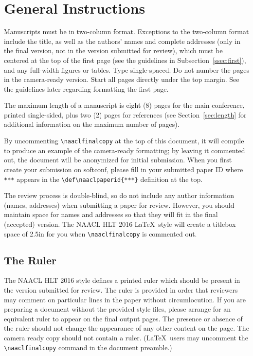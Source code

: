 \documentclass[11pt,letterpaper]{article}
\def\naaclpaperid{***} %
\begin{document}
\section{General Instructions}

Manuscripts must be in two-column format.  Exceptions to the
two-column format include the title, as well as the 
authors' names and complete
addresses (only in the final version, not in the version submitted for review), 
which must be centered at the top of the first page (see
the guidelines in Subsection~\ref{ssec:first}), and any full-width
figures or tables.  Type single-spaced.  Do not number the pages 
in the camera-ready version.
Start all pages directly under the top margin.  See the guidelines
later regarding formatting the first page.

The maximum length of a manuscript is eight (8) pages for the main
conference, printed single-sided, plus two (2) pages for references
(see Section~\ref{sec:length} for additional information on the
maximum number of pages). 

By uncommenting {\small\verb|\naaclfinalcopy|} at the top of this 
 document, it will compile to produce an example of the camera-ready formatting; by leaving it commented out, the document will be anonymized for initial submission.  When you first create your submission on softconf, please fill in your submitted paper ID where {\small\verb|***|} appears in the {\small\verb|\def\naaclpaperid{***}|} definition at the top.

The review process is double-blind, so do not include any author information (names, addresses) when submitting a paper for review.  
However, you should maintain space for names and addresses so that they will fit in the final (accepted) version.  The NAACL HLT 2016 \LaTeX\ style will create a titlebox space of 2.5in for you when {\small\verb|\naaclfinalcopy|} is commented out.  

\subsection{The Ruler}
The NAACL HLT 2016 style defines a printed ruler which should be present in the
version submitted for review.  The ruler is provided in order that
reviewers may comment on particular lines in the paper without
circumlocution.  If you are preparing a document without the provided
style files, please arrange for an equivalent ruler to
appear on the final output pages.  The presence or absence of the ruler
should not change the appearance of any other content on the page.  The
camera ready copy should not contain a ruler. (\LaTeX\ users may uncomment
the {\small\verb|\naaclfinalcopy|} command in the document preamble.)  
\end{document}
